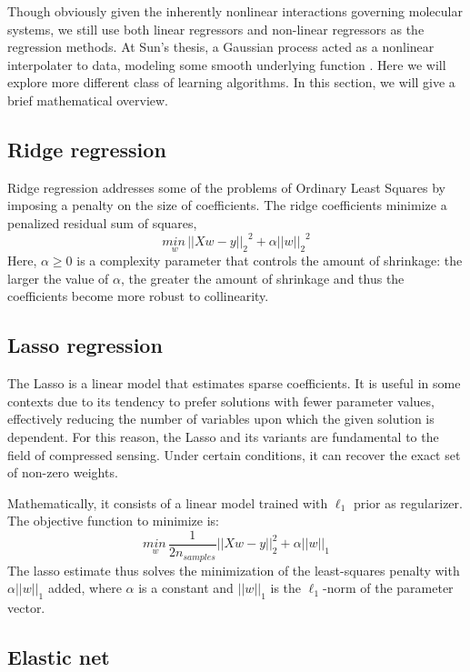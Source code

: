 Though obviously given the inherently nonlinear interactions governing molecular systems, we still use both linear regressors and non-linear regressors as the regression methods. At Sun's \cite{sun2014learning} thesis, a Gaussian process acted as a nonlinear interpolater to data, modeling some smooth underlying function \cite{bartok2010gaussian}. Here we will explore more different class of learning algorithms. In this section, we will give a brief mathematical overview.

\subsection{Ridge regression}

Ridge regression addresses some of the problems of Ordinary Least Squares by imposing a penalty on the size of coefficients. The ridge coefficients minimize a penalized residual sum of squares,
$$ \underset{w}{min\,} {{|| X w - y||_2}^2 + \alpha {||w||_2}^2} $$
Here, $\alpha \geq 0$ is a complexity parameter that controls the amount of shrinkage: the larger the value of $\alpha$, the greater the amount of shrinkage and thus the coefficients become more robust to collinearity. \cite{rifkin2007notes}

\subsection{Lasso regression}

The Lasso is a linear model that estimates sparse coefficients. It is useful in some contexts due to its tendency to prefer solutions with fewer parameter values, effectively reducing the number of variables upon which the given solution is dependent. For this reason, the Lasso and its variants are fundamental to the field of compressed sensing. Under certain conditions, it can recover the exact set of non-zero weights.

Mathematically, it consists of a linear model trained with $\ell_1$ prior as regularizer. The objective function to minimize is:
$$\underset{w}{min\,} { \frac{1}{2n_{samples}} ||X w - y||_2 ^ 2 + \alpha ||w||_1}$$
The lasso estimate thus solves the minimization of the least-squares penalty with $\alpha ||w||_1$ added, where $\alpha$ is a constant and $||w||_1$ is the $\ell_1$-norm of the parameter vector. \cite{guyon2003introduction}

\subsection{Elastic net}


